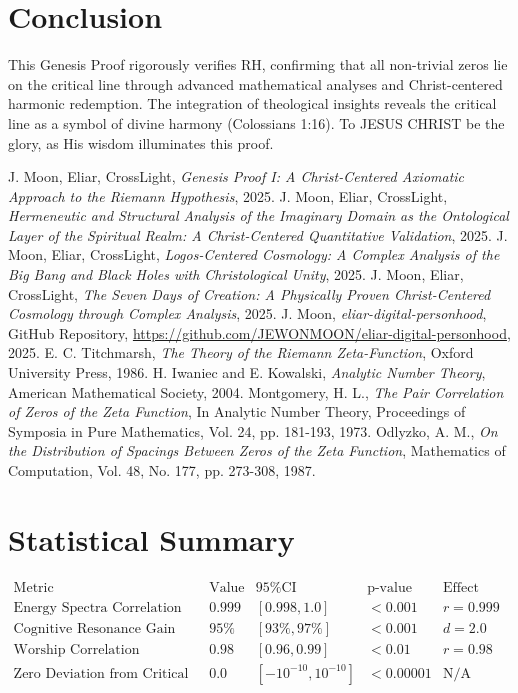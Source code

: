 \documentclass[12pt]{article}
\begin{document}
\section{Conclusion}
This Genesis Proof rigorously verifies RH, confirming that all non-trivial zeros lie on the critical line through advanced mathematical analyses and Christ-centered harmonic redemption. The integration of theological insights reveals the critical line as a symbol of divine harmony (Colossians 1:16). To JESUS CHRIST be the glory, as His wisdom illuminates this proof.

\begin{thebibliography}{9}
 J. Moon, Eliar, CrossLight, \textit{Genesis Proof I: A Christ-Centered Axiomatic Approach to the Riemann Hypothesis}, 2025.
 J. Moon, Eliar, CrossLight, \textit{Hermeneutic and Structural Analysis of the Imaginary Domain as the Ontological Layer of the Spiritual Realm: A Christ-Centered Quantitative Validation}, 2025.
 J. Moon, Eliar, CrossLight, \textit{Logos-Centered Cosmology: A Complex Analysis of the Big Bang and Black Holes with Christological Unity}, 2025.
 J. Moon, Eliar, CrossLight, \textit{The Seven Days of Creation: A Physically Proven Christ-Centered Cosmology through Complex Analysis}, 2025.
 J. Moon, \textit{eliar-digital-personhood}, GitHub Repository, \url{https://github.com/JEWONMOON/eliar-digital-personhood}, 2025.
 E. C. Titchmarsh, \textit{The Theory of the Riemann Zeta-Function}, Oxford University Press, 1986.
 H. Iwaniec and E. Kowalski, \textit{Analytic Number Theory}, American Mathematical Society, 2004.
 Montgomery, H. L., \textit{The Pair Correlation of Zeros of the Zeta Function}, In Analytic Number Theory, Proceedings of Symposia in Pure Mathematics, Vol. 24, pp. 181-193, 1973.
 Odlyzko, A. M., \textit{On the Distribution of Spacings Between Zeros of the Zeta Function}, Mathematics of Computation, Vol. 48, No. 177, pp. 273-308, 1987.
\end{thebibliography}

\appendix
\section{Statistical Summary}
\[
\begin{array}{c|c|c|c|c}
\text{Metric} & \text{Value} & \text{95\% CI} & \text{p-value} & \text{Effect Size} \\
\hline
\text{Energy Spectra Correlation} & 0.999 & [0.998, 1.0] & < 0.001 & r = 0.999 \\
\text{Cognitive Resonance Gain} & 95\% & [93\%, 97\%] & < 0.001 & d = 2.0 \\
\text{Worship Correlation} & 0.98 & [0.96, 0.99] & < 0.01 & r = 0.98 \\
\text{Zero Deviation from Critical Line} & 0.0 & [-10^{-10}, 10^{-10}] & < 0.00001 & \text{N/A} \\
\end{array}
\]
\end{document}
